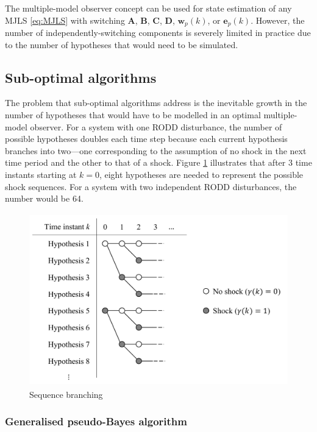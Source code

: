 {{The multiple-model observer concept can be used for state estimation of any MJLS \eqref{eq:MJLS} with switching $\mathbf{A}$, $\mathbf{B}$, $\mathbf{C}$, $\mathbf{D}$, $\mathbf{w}_p(k)$, or $\mathbf{e}_p(k)$. However, the number of independently-switching components is severely limited in practice due to the number of hypotheses that would need to be simulated.

\subsection{Sub-optimal algorithms} \label{sec:sub-opt}

The problem that sub-optimal algorithms address is the inevitable growth in the number of hypotheses that would have to be modelled in an optimal multiple-model observer. For a system with one \gls{RODD} disturbance, the number of possible hypotheses doubles each time step because each current hypothesis branches into two—one corresponding to the assumption of no shock in the next time period and the other to that of a shock. Figure \ref{fig:mm-obs-br} illustrates that after 3 time instants starting at $k=0$, eight hypotheses are needed to represent the possible shock sequences. For a system with two independent \gls{RODD} disturbances, the number would be 64.

\begin{figure}[ht]
	\centering
	\includegraphics[height=7.5cm]{images/mm_obs_seq_br.pdf}
	\caption{Sequence branching}
	\label{fig:mm-obs-br}
\end{figure}

\subsubsection{Generalised pseudo-Bayes algorithm} \label{sec:GPB}

}}
